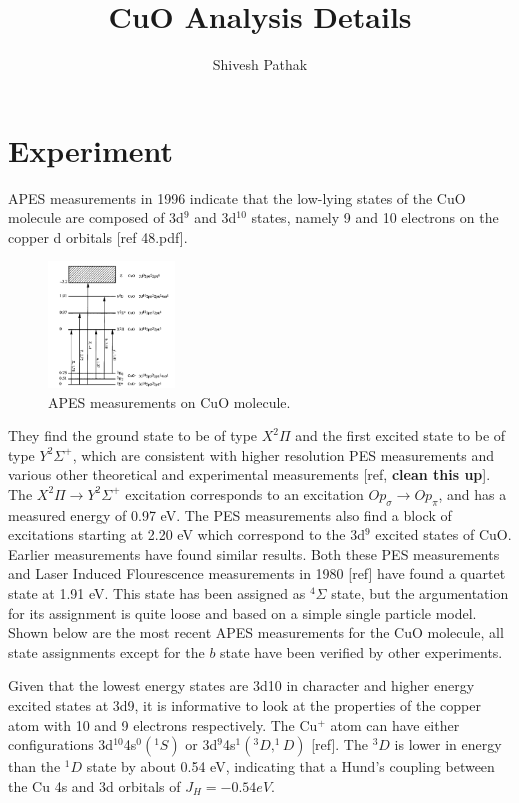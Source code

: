 \documentclass{article}
\title{CuO Analysis Details}
\author{Shivesh Pathak}
\begin{document}
\maketitle
\section{Experiment}
APES measurements in 1996 indicate that the low-lying states of the CuO molecule are composed of 3d$^9$ and 3d$^10$ states, namely 9 and 10 electrons on the copper d orbitals [ref 48.pdf].

\begin{figure}
  \begin{center}
    \includegraphics[width=0.3\textwidth]{APES.png}
  \end{center}
  \caption{APES measurements on CuO molecule.}
\end{figure}

They find the ground state to be of type $X^2\Pi$ and the first excited state to be of type $Y^2\Sigma^+$, which are consistent with higher resolution PES measurements and various other theoretical and experimental measurements [ref, \textbf{clean this up}]. The $X^2\Pi \rightarrow Y^2\Sigma^+$ excitation corresponds to an excitation $O p_\sigma \rightarrow O p_\pi$, and has a measured energy of 0.97 eV. The PES measurements also find a block of excitations starting at 2.20 eV which correspond to the 3d$^9$ excited states of CuO. Earlier measurements have found similar results. Both these PES measurements and Laser Induced Flourescence measurements in 1980 [ref] have found a quartet state at 1.91 eV. This state has been assigned as $^4\Sigma$ state, but the argumentation for its assignment is quite loose and based on a simple single particle model. Shown below are the most recent APES measurements for the CuO molecule, all state assignments except for the $b$ state have been verified by other experiments.

Given that the lowest energy states are 3d10 in character and higher energy excited states at 3d9, it is informative to look at the properties of the copper atom with 10 and 9 electrons respectively. The Cu$^+$ atom can have either configurations 3d$^10$4s$^0 (^1S)$ or 3d$^9$4s$^1 (^3D, ^1D)$ [ref]. The $^3D$ is lower in energy than the $^1D$ state by about 0.54 eV, indicating that a Hund's coupling between the Cu 4s and 3d orbitals of $J_H = -0.54 eV$. 
\end{document}
